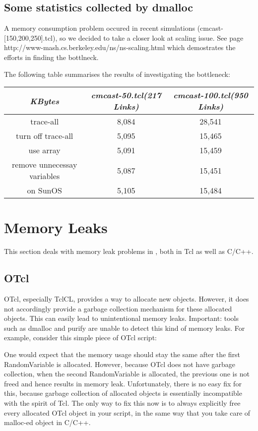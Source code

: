\subsection{Some statistics collected by dmalloc}
\label{sec:statdmalloc}

A memory consumption problem occured in recent simulations 
(cmcast-[150,200,250].tcl), so we decided to take a closer look at scaling
issue. See page http://www-mash.cs.berkeley.edu/ns/ns-scaling.html
which demostrates the efforts in finding the bottlneck. 
 
The following table summarises the results of investigating the
bottleneck:\\
\begin{table}[h]
\begin{center}
\begin{tabular}{|c|c|c|}\hline  
{\em KBytes} &{\em cmcast-50.tcl(217 Links)} &{\em cmcast-100.tcl(950 
Links)}\\\hline 
trace-all &8,084 &28,541\\\hline
turn off trace-all &5,095 &15,465 \\\hline
use array &5,091 &15,459\\\hline 
remove unnecessay variables &5,087 &15,451 \\\hline
on SunOS &5,105 &15,484\\\hline
\end{tabular}
\end{center}
\end{table}


\section{Memory Leaks}
\label{memleak}

This section deals with memory leak problems in \ns, both in Tcl as well
as C/C++.


\subsection{OTcl}
\label{leakTcl}
OTcl, especially TclCL, provides a way to allocate new objects. However,
it does not accordingly provide a garbage collection mechanism for these
allocated objects. This can easily lead to unintentional memory leaks.
Important: tools such as dmalloc and purify are unable to detect this kind
of memory leaks. For example, consider this simple piece of OTcl script: 
One would expect that the memory usage should stay the same after the
first RandomVariable is allocated. However, because OTcl does not have
garbage collection, when the second RandomVariable is allocated, the
previous one is not freed and hence results in memory leak. Unfortunately,
there is no easy fix for this, because garbage collection of allocated
objects is essentially incompatible with the spirit of Tcl. The only way
to fix this now is to always explicitly free every allocated OTcl object
in your script, in the same way that you take care of malloc-ed object in
C/C++. 


